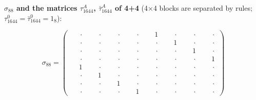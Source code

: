 \documentclass[
  10pt,
]{article}
\begin{document}
\textbf{\(\sigma_{88}\) and the matrices \(\tau_{1644}^A\),
\(\bar\tau_{1644}^A\) of 4+4} (4×4 blocks are separated by rules;
\(\tau_{1644}^0=\bar\tau_{1644}^0=1_8\)):

\[
\sigma_{88} = \left(\begin{array}{rrrr|rrrr}
\phantom{-}\cdot & \phantom{-}\cdot & \phantom{-}\cdot & \phantom{-}\cdot & \phantom{-}1 & \phantom{-}\cdot & \phantom{-}\cdot & \phantom{-}\cdot \\[-1.8pt]
\phantom{-}\cdot & \phantom{-}\cdot & \phantom{-}\cdot & \phantom{-}\cdot & \phantom{-}\cdot & \phantom{-}1 & \phantom{-}\cdot & \phantom{-}\cdot \\[-1.8pt]
\phantom{-}\cdot & \phantom{-}\cdot & \phantom{-}\cdot & \phantom{-}\cdot & \phantom{-}\cdot & \phantom{-}\cdot & \phantom{-}1 & \phantom{-}\cdot \\[-1.8pt]
\phantom{-}\cdot & \phantom{-}\cdot & \phantom{-}\cdot & \phantom{-}\cdot & \phantom{-}\cdot & \phantom{-}\cdot & \phantom{-}\cdot & \phantom{-}1 \\[-1.8pt]
\hline
\phantom{-}1 & \phantom{-}\cdot & \phantom{-}\cdot & \phantom{-}\cdot & \phantom{-}\cdot & \phantom{-}\cdot & \phantom{-}\cdot & \phantom{-}\cdot \\[-1.8pt]
\phantom{-}\cdot & \phantom{-}1 & \phantom{-}\cdot & \phantom{-}\cdot & \phantom{-}\cdot & \phantom{-}\cdot & \phantom{-}\cdot & \phantom{-}\cdot \\[-1.8pt]
\phantom{-}\cdot & \phantom{-}\cdot & \phantom{-}1 & \phantom{-}\cdot & \phantom{-}\cdot & \phantom{-}\cdot & \phantom{-}\cdot & \phantom{-}\cdot \\[-1.8pt]
\phantom{-}\cdot & \phantom{-}\cdot & \phantom{-}\cdot & \phantom{-}1 & \phantom{-}\cdot & \phantom{-}\cdot & \phantom{-}\cdot & \phantom{-}\cdot
\end{array}\right)
\]
\end{document}
